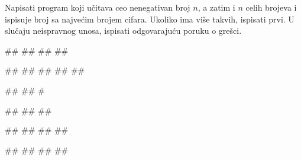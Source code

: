 \begin{Exercise}[label=PET_23] 
Napisati program koji učitava ceo nenegativan broj $n$, a zatim i $n$ celih
brojeva i ispisuje broj sa najvećim brojem cifara. 
Ukoliko ima više takvih, ispisati prvi.
U slučaju neispravnog unosa, ispisati odgovarajuću poruku o grešci.

\begin{miditest}
\begin{upotreba}{1}
#\naslovInt#
##
##
##
\end{upotreba}
\end{miditest}
\begin{miditest}
\begin{upotreba}{2}
#\naslovInt#
##
##
##
##
\end{upotreba}
\end{miditest}

\begin{miditest}
\begin{upotreba}{3}
#\naslovInt#
##
#
\end{upotreba}
\end{miditest}
\begin{miditest}
\begin{upotreba}{4}
#\naslovInt#
##
##
\end{upotreba}
\end{miditest}

\begin{miditest}
\begin{upotreba}{5}
#\naslovInt#
##
##
##
\end{upotreba}
\end{miditest}
\begin{miditest}
\begin{upotreba}{6}
#\naslovInt#
##
##
##
\end{upotreba}
\end{miditest}

\end{Exercise}
\ifresenja
\begin{Answer}[ref=PET_23]
\end{Answer}
\fi


